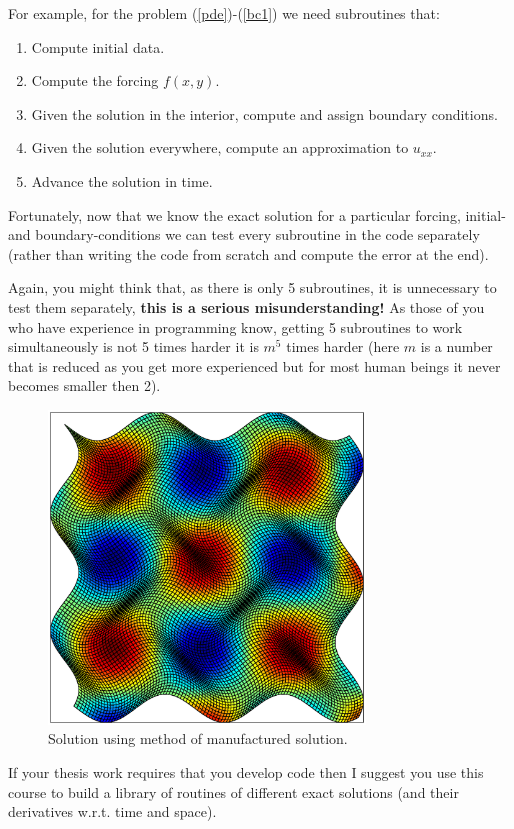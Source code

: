 \documentclass[]{amsart}
\begin{document}
For example, for the problem (\ref{pde})-(\ref{bc1}) we need subroutines that:
\begin{enumerate}
\item Compute initial data. 
\item Compute the forcing $f(x,y)$.
\item Given the solution in the interior, compute and assign boundary conditions.
\item Given the solution everywhere, compute an approximation to $u_{xx}$.
\item Advance the solution in time.
\end{enumerate}
Fortunately, now that we know the exact solution for a particular forcing, initial- and boundary-conditions we can test every subroutine in the code separately (rather than writing the code from scratch and compute the error at the end). 

Again, you might think that, as there is only 5 subroutines, it is unnecessary to test them separately, {\bf this is a serious misunderstanding!} As those of you who have experience in programming know, getting 5 subroutines to work simultaneously is not 5 times harder it is $m^5$ times harder (here $m$ is a number that is reduced as you get more experienced but for most human beings it never becomes smaller then 2). 

\begin{figure}[t]
  \begin{center}
 \includegraphics[width=0.75\textwidth]{mmsgrid}
    \caption{Solution using method of manufactured solution.\label{fig:mms}}
  \end{center}
\end{figure}
If your thesis work requires that you develop code then I suggest you use this course to build a library of routines of different exact solutions (and their derivatives w.r.t. time and space). 
\end{document}
